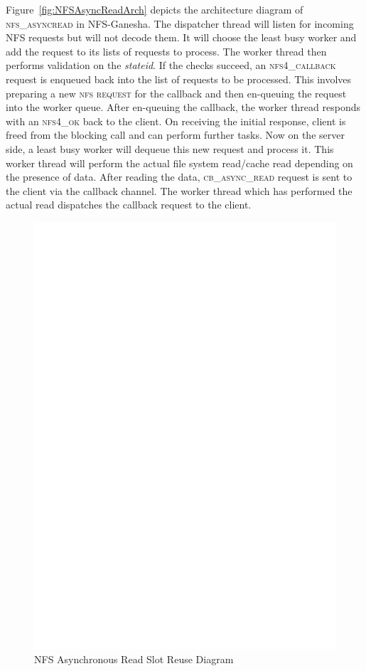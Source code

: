  Figure~\ref{fig:NFSAsyncReadArch} depicts the architecture diagram of \textsc{nfs\_asyncread} in NFS-Ganesha. The dispatcher thread will listen for incoming NFS requests but will not decode them. It will choose the least busy worker and add the request to its lists of requests to process. The worker thread then performs validation on the \textit{stateid}. If  the checks succeed, an \textsc{nfs4\_callback} request is enqueued back into the list of requests to be processed.  This involves preparing a new \textsc{nfs request} for the callback and then en-queuing the request into the worker queue. After en-queuing the callback, the worker thread responds with an \textsc{nfs4\_ok} back to the client. On receiving the initial response, client is freed from the blocking call and can perform further tasks. Now on the server side, a least busy worker will dequeue this new request and process it. This worker thread will perform the actual file system read/cache read depending on the presence of data. After reading the data, \textsc{cb\_async\_read} request is sent to the client via the callback channel. The worker thread which has performed the actual read dispatches the callback request to the client. 
 
 
\begin{figure}
\centering
\includegraphics[scale=0.7]{figures/Slotreuse.eps}
\caption{NFS Asynchronous Read Slot Reuse Diagram}
\label{fig:NFSSlotreuse}
\end{figure}
	
